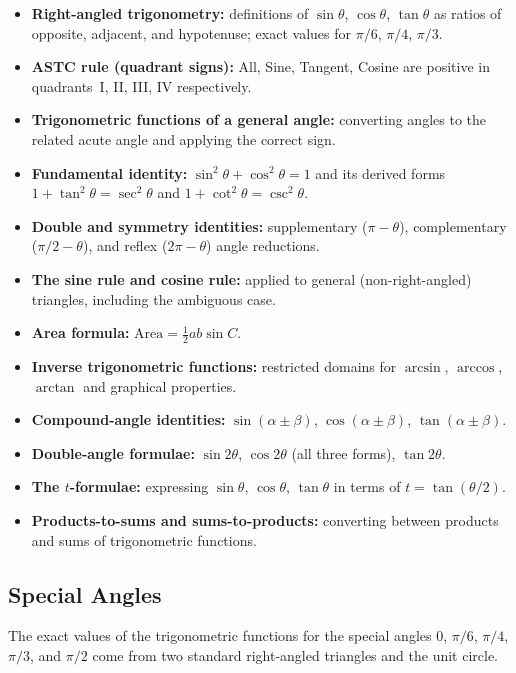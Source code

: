 \documentclass[12pt]{article}
\begin{document}
\begin{itemize}[leftmargin=*]
  \item \textbf{Right-angled trigonometry:} definitions of $\sin\theta$, $\cos\theta$, $\tan\theta$ as ratios of opposite, adjacent, and hypotenuse; exact values for $\pi/6$, $\pi/4$, $\pi/3$.
  \item \textbf{ASTC rule (quadrant signs):} All, Sine, Tangent, Cosine are positive in quadrants~I, II, III, IV respectively.
  \item \textbf{Trigonometric functions of a general angle:} converting angles to the related acute angle and applying the correct sign.
  \item \textbf{Fundamental identity:} $\sin^2\theta + \cos^2\theta = 1$ and its derived forms $1 + \tan^2\theta = \sec^2\theta$ and $1 + \cot^2\theta = \csc^2\theta$.
  \item \textbf{Double and symmetry identities:} supplementary ($\pi - \theta$), complementary ($\pi/2 - \theta$), and reflex ($2\pi - \theta$) angle reductions.
  \item \textbf{The sine rule and cosine rule:} applied to general (non-right-angled) triangles, including the ambiguous case.
  \item \textbf{Area formula:} $\text{Area} = \tfrac{1}{2}ab\sin C$.
  \item \textbf{Inverse trigonometric functions:} restricted domains for $\arcsin$, $\arccos$, $\arctan$ and graphical properties.
  \item \textbf{Compound-angle identities:} $\sin(\alpha \pm \beta)$, $\cos(\alpha \pm \beta)$, $\tan(\alpha \pm \beta)$.
  \item \textbf{Double-angle formulae:} $\sin 2\theta$, $\cos 2\theta$ (all three forms), $\tan 2\theta$.
  \item \textbf{The $t$-formulae:} expressing $\sin\theta$, $\cos\theta$, $\tan\theta$ in terms of $t = \tan(\theta/2)$.
  \item \textbf{Products-to-sums and sums-to-products:} converting between products and sums of trigonometric functions.
\end{itemize}

\subsection{Special Angles}

The exact values of the trigonometric functions for the special angles
$0$, $\pi/6$, $\pi/4$, $\pi/3$, and $\pi/2$ come from two standard
right-angled triangles and the unit circle.
\end{document}
